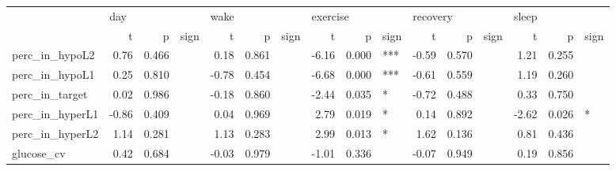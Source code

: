 \begin{tabular}{lrrlrrlrrlrrlrrl}
\toprule
{} & \multicolumn{3}{l}{day} & \multicolumn{3}{l}{wake} & \multicolumn{3}{l}{exercise} & \multicolumn{3}{l}{recovery} & \multicolumn{3}{l}{sleep} \\
{} &     t &      p & sign &     t &      p & sign &        t &      p & sign &        t &      p & sign &     t &      p & sign \\
\midrule
perc_in_hypoL2  &  0.76 &  0.466 &      &  0.18 &  0.861 &      &    -6.16 &  0.000 &  *** &    -0.59 &  0.570 &      &  1.21 &  0.255 &      \\
perc_in_hypoL1  &  0.25 &  0.810 &      & -0.78 &  0.454 &      &    -6.68 &  0.000 &  *** &    -0.61 &  0.559 &      &  1.19 &  0.260 &      \\
perc_in_target  &  0.02 &  0.986 &      & -0.18 &  0.860 &      &    -2.44 &  0.035 &    * &    -0.72 &  0.488 &      &  0.33 &  0.750 &      \\
perc_in_hyperL1 & -0.86 &  0.409 &      &  0.04 &  0.969 &      &     2.79 &  0.019 &    * &     0.14 &  0.892 &      & -2.62 &  0.026 &    * \\
perc_in_hyperL2 &  1.14 &  0.281 &      &  1.13 &  0.283 &      &     2.99 &  0.013 &    * &     1.62 &  0.136 &      &  0.81 &  0.436 &      \\
glucose_cv      &  0.42 &  0.684 &      & -0.03 &  0.979 &      &    -1.01 &  0.336 &      &    -0.07 &  0.949 &      &  0.19 &  0.856 &      \\
\bottomrule
\end{tabular}
